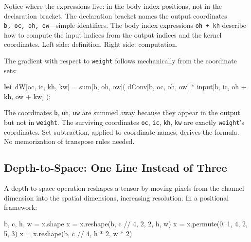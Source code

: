 \documentclass[11pt,titlepage]{article}
\newenvironment{Shaded}{}{}
\newcommand{\DecValTok}[1]{\textcolor[rgb]{0.25,0.63,0.44}{#1}}
\newcommand{\KeywordTok}[1]{\textcolor[rgb]{0.00,0.44,0.13}{\textbf{#1}}}
\newcommand{\NormalTok}[1]{#1}
\newcommand{\OperatorTok}[1]{\textcolor[rgb]{0.40,0.40,0.40}{#1}}
\begin{document}
Notice where the expressions live: in the body index positions, not in
the declaration bracket. The declaration bracket names the output
coordinates \texttt{b,\ oc,\ oh,\ ow}---simple identifiers. The body
index expressions \texttt{oh\ +\ kh} describe how to compute the input
indices from the output indices and the kernel coordinates. Left side:
definition. Right side: computation.

The gradient with respect to \texttt{weight} follows mechanically from
the coordinate sets:

\begin{Shaded}
\begin{Highlighting}[]
\KeywordTok{let}\NormalTok{ dW}\OperatorTok{[}\NormalTok{oc, ic, kh, kw}\OperatorTok{]}\NormalTok{ = sum}\OperatorTok{[}\NormalTok{b, oh, ow}\OperatorTok{]}\NormalTok{(}
\NormalTok{    dConv}\OperatorTok{[}\NormalTok{b, oc, oh, ow}\OperatorTok{]}\NormalTok{ * input}\OperatorTok{[}\NormalTok{b, ic, oh + kh, ow + kw}\OperatorTok{]}
\NormalTok{);}
\end{Highlighting}
\end{Shaded}

The coordinates \texttt{b}, \texttt{oh}, \texttt{ow} are summed away
because they appear in the output but not in \texttt{weight}. The
surviving coordinates \texttt{oc}, \texttt{ic}, \texttt{kh}, \texttt{kw}
are exactly \texttt{weight}'s coordinates. Set subtraction, applied to
coordinate names, derives the formula. No memorization of transpose
rules needed.

\vspace{2em}

\hypertarget{depth-to-space-one-line-instead-of-three}{%
\subsection{Depth-to-Space: One Line Instead of
Three}\label{depth-to-space-one-line-instead-of-three}}

A depth-to-space operation reshapes a tensor by moving pixels from the
channel dimension into the spatial dimensions, increasing resolution. In
a positional framework:

\begin{Shaded}
\begin{Highlighting}[]
\NormalTok{b, c, h, w }\OperatorTok{=}\NormalTok{ x.shape}
\NormalTok{x }\OperatorTok{=}\NormalTok{ x.reshape(b, c }\OperatorTok{//} \DecValTok{4}\NormalTok{, }\DecValTok{2}\NormalTok{, }\DecValTok{2}\NormalTok{, h, w)}
\NormalTok{x }\OperatorTok{=}\NormalTok{ x.permute(}\DecValTok{0}\NormalTok{, }\DecValTok{1}\NormalTok{, }\DecValTok{4}\NormalTok{, }\DecValTok{2}\NormalTok{, }\DecValTok{5}\NormalTok{, }\DecValTok{3}\NormalTok{)}
\NormalTok{x }\OperatorTok{=}\NormalTok{ x.reshape(b, c }\OperatorTok{//} \DecValTok{4}\NormalTok{, h }\OperatorTok{*} \DecValTok{2}\NormalTok{, w }\OperatorTok{*} \DecValTok{2}\NormalTok{)}
\end{Highlighting}
\end{Shaded}
\end{document}
